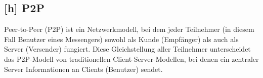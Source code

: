 \subsection*{[h] P2P}
\label{glo:p2p}
Peer-to-Peer (P2P) ist ein Netzwerkmodell, bei dem jeder Teilnehmer (in diesem Fall Benutzer eines Messengers) sowohl als Kunde (Empfänger) als auch als Server (Versender) fungiert. Diese Gleichstellung aller Teilnehmer unterscheidet das P2P-Modell von traditionellen Client-Server-Modellen, bei denen ein zentraler Server Informationen an Clients (Benutzer) sendet.
